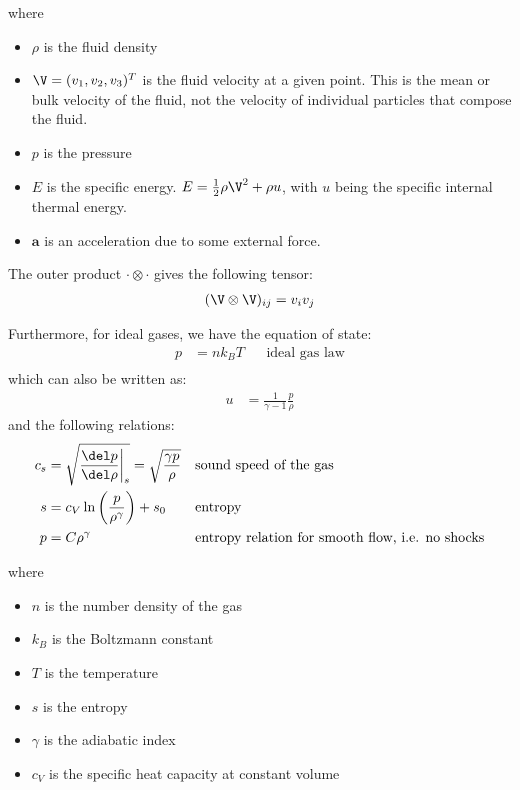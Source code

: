 where
\begin{itemize}
	\item $\rho$ is the fluid density
	\item $\V = (v_1, v_2, v_3)^T$ is the fluid velocity at a given point. This is the mean
or bulk velocity of the fluid, not the velocity of individual particles that compose the fluid.
	\item $p$ is the pressure
	\item $E$ is the specific energy. $E = \frac{1}{2} \rho \V^2 + \rho u$, with $u$ being the
specific internal thermal energy.
	\item $\mathbf{a}$ is an acceleration due to some external force.
\end{itemize}

The outer product $\cdot \otimes \cdot$ gives the following tensor:
\begin{align}
	(\V \otimes \V)_{ij} = v_i v_j
\end{align}


Furthermore, for ideal gases, we have the equation of state:
%
\begin{align}
	p &= n k_B T && \text{ideal gas law} \\
\end{align}
%
which can also be written as:
%
\begin{align}
	u &= \frac{1}{\gamma - 1}\frac{p}{\rho} \label{eq:equation-of-state}
\end{align}
%
and the following relations:
%
\begin{align}
	c_s &= \sqrt{\frac{\del p}{\del \rho} \bigg{|}_s } = \sqrt{\frac{\gamma p}{\rho}} &&
\text{sound speed of the gas} \\
	s &= c_V \ln \left( \frac{p}{\rho^\gamma} \right) + s_0 && \text{entropy} \label{eq:entropy}\\
	p &= C \rho ^ \gamma && \text{entropy relation for smooth flow, i.e. no shocks}
\end{align}

where
\begin{itemize}
	\item $n$ is the number density of the gas
	\item $k_B$ is the Boltzmann constant
	\item $T$ is the temperature
	\item $s$ is the entropy
	\item $\gamma$ is the adiabatic index
    \item $c_V$ is the specific heat capacity at constant volume
\end{itemize}



